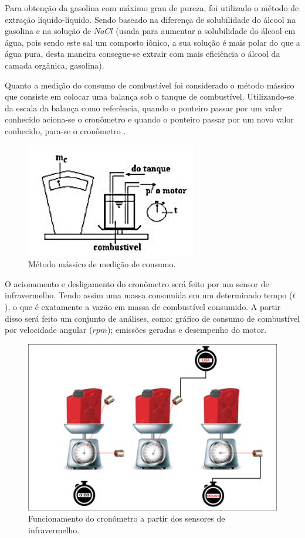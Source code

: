 Para obtenção da gasolina com máximo grau de pureza, foi utilizado o método de extração líquido-líquido. Sendo baseado na diferença de solubilidade do álcool na gasolina e na solução de $NaCl$ (usada para aumentar a solubilidade do álcool em água, pois sendo este sal um composto iônico, a sua solução é mais polar do que a água pura, desta maneira consegue-se extrair com mais eficiência o álcool da camada orgânica, gasolina).

Quanto a medição do consumo de combustível foi considerado o método mássico que consiste em colocar uma balança sob o tanque de combustível. Utilizando-se da escala da balança como referência, quando o ponteiro passar por um valor conhecido aciona-se o cronômetro e quando o ponteiro passar por um novo valor conhecido, para-se o cronômetro \cite{taylor}.

\begin{figure}[h!]
	\centering
	\includegraphics[keepaspectratio=true,scale= 0.6]{figuras/medicao-de-consumo.png}
	\caption{Método mássico de medição de consumo.}
	\label{medicao-de-consumo}
\end{figure}

 O acionamento e desligamento do cronômetro será feito por um sensor de infravermelho. Tendo assim uma massa consumida em um determinado tempo ($t$), o que é exatamente a vazão em massa de combustível consumido. A partir disso será feito um conjunto de análises, como: gráfico de consumo de combustível por velocidade angular ($rpm$); emissões geradas e desempenho do motor.

\begin{figure}[h!]
	\centering
	\includegraphics[keepaspectratio=true,scale= 0.6]{figuras/funcionamento-cronometro.png}
	\caption{Funcionamento do cronômetro a partir dos sensores de infravermelho.}
	\label{funcionamento-cronometro}
\end{figure}